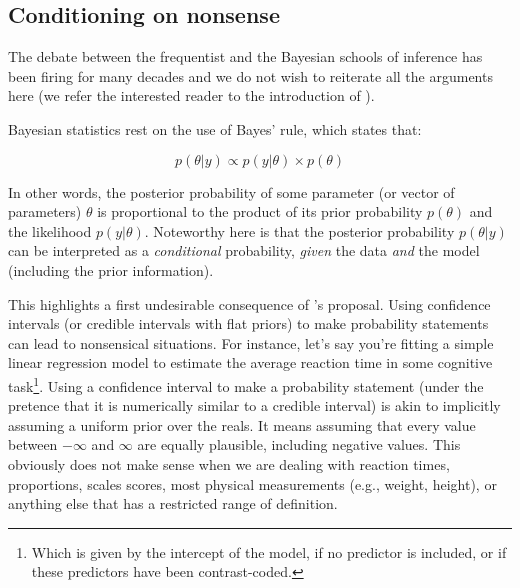 \documentclass[a4paper,man,natbib,floatsintext,donotrepeattitle]{apa6}
\begin{document}
\subsection{Conditioning on nonsense}

The debate between the frequentist and the Bayesian schools of inference has been firing for many decades and we do not wish to reiterate all the arguments here (we refer the interested reader to the introduction of \citealp{albers_credible_2018}).

Bayesian statistics rest on the use of Bayes' rule, which states that:

$$ p(\theta|y) \propto p(y|\theta) \times p(\theta) $$

In other words, the posterior probability of some parameter (or vector of parameters) $\theta$ is proportional to the product of its prior probability $p(\theta)$ and the likelihood $p(y|\theta)$. Noteworthy here is that the posterior probability $p(\theta|y)$ can be interpreted as a \textit{conditional} probability, \textit{given} the data \textit{and} the model (including the prior information).

 This highlights a first undesirable consequence of \cite{albers_credible_2018}'s proposal. Using confidence intervals (or credible intervals with flat priors) to make probability statements can lead to nonsensical situations. For instance, let's say you're fitting a simple linear regression model to estimate the average reaction time in some cognitive task\footnote{Which is given by the intercept of the model, if no predictor is included, or if these predictors have been contrast-coded.}. Using a confidence interval to make a probability statement (under the pretence that it is numerically similar to a credible interval) is akin to implicitly assuming a uniform prior over the reals. It means assuming that every value between $-\infty$ and $\infty$ are equally plausible, including negative values. This obviously does not make sense when we are dealing with reaction times, proportions, scales scores, most physical measurements (e.g., weight, height), or anything else that has a restricted range of definition.
 
\end{document}
